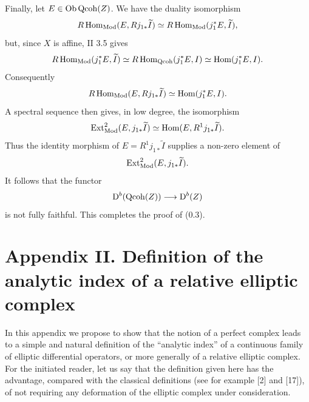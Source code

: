 \documentclass[11pt]{article}
\newcommand{\Parf}{\operatorname{Parf}}
\providecommand{\cF}{\mathscr F}
\providecommand{\Coker}{\operatorname{Coker}}
\providecommand{\Ker}{\operatorname{Ker}}
\providecommand{\cO}{\mathcal O}
\begin{document}
Finally, let $E\in\Ob\Qcoh(Z)$. We have the duality isomorphism
\[
 R\Hom_{\Mod}(E,Rj_{1*}\widetilde I)
 \simeq R\Hom_{\Mod}(j_1^*E,\widetilde I),
\]
but, since $X$ is affine, II 3.5 gives
\[
 R\Hom_{\Mod}(j_1^*E,\widetilde I)
 \simeq R\Hom_{\Qcoh}(j_1^*E,I)
 \simeq \Hom(j_1^*E,I).
\]
Consequently
\[
 R\Hom_{\Mod}(E,Rj_{1*}\widetilde I)
 \simeq \Hom(j_1^*E,I).
\]
A spectral sequence then gives, in low degree, the isomorphism
\[
 \Ext^2_{\Mod}(E,j_{1*}\widetilde I)
 \simeq \Hom(E,R^1j_{1*}\widetilde I).
\]
Thus the identity morphism of $E=R^1j_{1*}\widetilde I$ supplies a non-zero element of
\[
 \Ext^2_{\Mod}(E,j_{1*}\widetilde I).
\]
It follows that the functor
\[
 \mathrm D^b(\operatorname{Qcoh}(Z))\longrightarrow \mathrm D^b(Z)
\]
is not fully faithful. This completes the proof of (0.3).




\providecommand{\Diff}{\operatorname{Diff}}
\providecommand{\Hom}{\operatorname{Hom}}
\providecommand{\im}{\operatorname{Im}}
\providecommand{\ind}{\operatorname{ind}}
\providecommand{\Cone}{\operatorname{Cone}}
\providecommand{\Loclib}{\operatorname{Loclib}}
\providecommand{\ob}{\operatorname{ob}}
\providecommand{\Parf}{\operatorname{Parf}}
\providecommand{\Mod}{\operatorname{Mod}}
\providecommand{\Ob}{\operatorname{Ob}}
\providecommand{\Coker}{\operatorname{Coker}}
\providecommand{\Ker}{\operatorname{Ker}}
\providecommand{\cH}{\mathcal H}
\providecommand{\cO}{\mathcal O}
\providecommand{\cP}{\mathcal P}
\providecommand{\cE}{\mathcal E}
\providecommand{\cF}{\mathcal F}
\providecommand{\cG}{\mathcal G}
\providecommand{\cD}{\mathcal D}
\providecommand{\cT}{\mathcal T}
\providecommand{\cL}{\mathcal L}
\providecommand{\RHom}{\mathrm R\!\operatorname{Hom}}
\providecommand{\RGamma}{\mathrm R\Gamma}
\providecommand{\dlim}{\operatorname*{lim}}
\providecommand{\plim}{\operatorname*{lim}}


\newpage
\section*{Appendix II. Definition of the analytic index of a relative elliptic complex}

In this appendix we propose to show that the notion of a perfect complex leads to a simple and natural definition of the ``analytic index'' of a continuous family of elliptic differential operators, or more generally of a relative elliptic complex. For the initiated reader, let us say that the definition given here has the advantage, compared with the classical definitions (see for example [2] and [17]), of not requiring any deformation of the elliptic complex under consideration.
\end{document}
